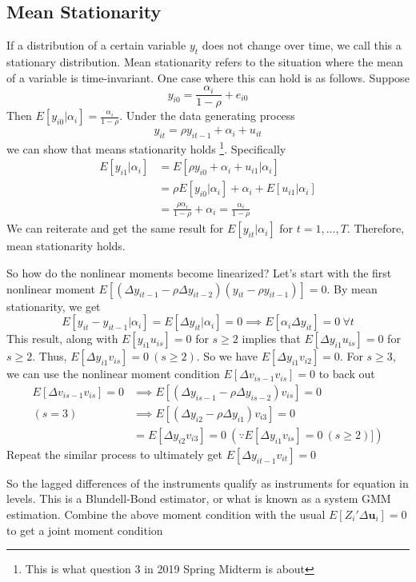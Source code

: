\documentclass[12pt]{article}
\theoremstyle{definition}
\theoremstyle{property}
\theoremstyle{assumption}
\theoremstyle{example}
\theoremstyle{comment}
\begin{document}
\subsection{Mean Stationarity}
If a distribution of a certain variable $y_t$ does not change over time, we call this a stationary distribution. Mean stationarity refers to the situation where the mean of a variable is time-invariant. One case where this can hold is as follows. Suppose
\[
y_{i0}=\frac{\alpha_i}{1-\rho}+e_{i0}
\]
Then $E[y_{i0}|\alpha_i]=\frac{\alpha_i}{1-\rho}$. Under the data generating process
\[
y_{it}=\rho y_{it-1}+\alpha_i +u_{it}
\]
we can show that means stationarity holds \footnote{This is what question 3 in 2019 Spring Midterm is about}. Specifically
\begin{align*}
E[y_{i1}|\alpha_i]&= E[\rho y_{i0}+\alpha_i +u_{i1}|\alpha_i]\\
&= \rho E[y_{i0}|\alpha_i]+\alpha_i + E[u_{i1}|\alpha_i]\\
&= \frac{\rho\alpha_i}{1-\rho}+\alpha_i = \frac{\alpha_i}{1-\rho}
\end{align*}
We can reiterate and get the same result for $E[y_{it}|\alpha_i]$ for $t=1,...,T$. Therefore, mean stationarity holds. \par
So how do the nonlinear moments become linearized? Let's start with the first nonlinear moment $E[(\Delta y_{it-1}-\rho\Delta y_{it-2})(y_{it}-\rho y_{it-1})]=0$. By mean stationarity, we get
\[
E[y_{it}-y_{it-1}|\alpha_i]=E[\Delta y_{it}|\alpha_i]=0 \implies E[\alpha_i \Delta y_{it}]=0 \ \forall t
\]
This result, along with $E[y_{i1}u_{is}]=0$ for $s\geq 2$ implies that $E[\Delta y_{i1}u_{is}]=0$ for $s\geq 2$. Thus, $E[\Delta y_{i1}v_{is}]=0 \ (s\geq 2)$. So we have $E[\Delta y_{i1}v_{i2}]=0$. For $s\geq 3$, we can use the nonlinear moment condition $E[\Delta v_{is-1}v_{is}]=0$ to back out
\begin{align*}
E[\Delta v_{is-1}v_{is}]=0&\implies E[(\Delta y_{is-1}-\rho \Delta y_{is-2})v_{is}]=0\\
(s=3)&\implies E[(\Delta y_{i2}-\rho\Delta y_{i1})v_{i3}]=0\\
&=E[\Delta y_{i2}v_{i3}]=0 \ (\because E[\Delta y_{i1}v_{is}]=0 \ (s\geq 2)])
\end{align*}
Repeat the similar process to ultimately get $E[\Delta y_{it-1}v_{it}]=0$\par
So the lagged differences of the instruments qualify as instruments for equation in levels. This is a Blundell-Bond estimator, or what is known as a system GMM estimation. Combine the above moment condition with the usual $E[Z_i'\Delta \mathbf{u}_i]=0$ to get a joint moment condition
\end{document}
